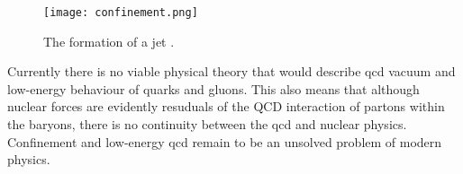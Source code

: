 	 \begin{figure}[htpb]
	\texttt{[image: confinement.png]}
	\caption{The formation of a jet \cite{conf_wiki}. }
	\label{fig::jet}
	\end{figure}
Currently there is no viable physical theory that would describe \gls{qcd} vacuum and low-energy behaviour of quarks and gluons. This also means that although nuclear forces are evidently resuduals of the QCD interaction of partons within the baryons, there is no continuity between the \gls{qcd} and nuclear physics. Confinement and low-energy \gls{qcd} remain to be an unsolved problem of modern physics. 


